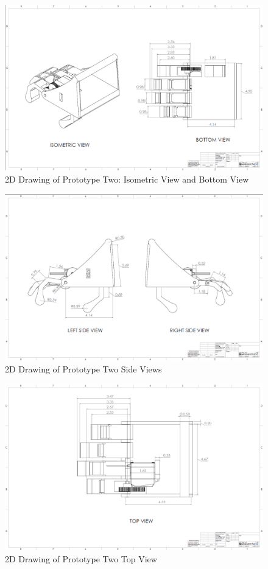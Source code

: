 \documentclass[11.5pt]{article}
\begin{document}
\begin{figure}[H]
    \centering
    \includegraphics[width=0.75\columnwidth]{2d/3DModelsPics/Screenshot (26).png}
    \caption{2D Drawing of Prototype Two: Isometric View and Bottom View}
    \label{RLDiagram}
\end{figure}
\begin{figure}[H]
    \centering
    \includegraphics[width=0.75\columnwidth]{2d/3DModelsPics/Screenshot (27).png}
    \caption{2D Drawing of Prototype Two Side Views}
    \label{RLDiagram}
\end{figure}
\begin{figure}[H]
    \centering
    \includegraphics[width=0.75\columnwidth]{2d/3DModelsPics/Screenshot (28).png}
    \caption{2D Drawing of Prototype Two Top View}
    \label{RLDiagram}
\end{figure}
\end{document}
